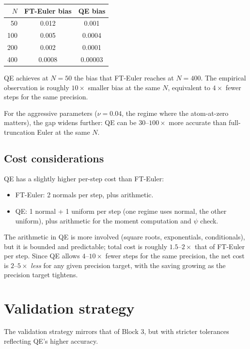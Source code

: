 \documentclass[11pt]{article}
\theoremstyle{plain}
\theoremstyle{definition}
\theoremstyle{remark}
\begin{document}
\begin{center}
\begin{tabular}{rcc}
\toprule
$N$ & FT-Euler bias & QE bias \\
\midrule
50 & 0.012 & 0.001 \\
100 & 0.005 & 0.0004 \\
200 & 0.002 & 0.0001 \\
400 & 0.0008 & 0.00003 \\
\bottomrule
\end{tabular}
\end{center}
QE achieves at $N = 50$ the bias that FT-Euler reaches at $N = 400$. The empirical observation is roughly $10\times$ smaller bias at the same $N$, equivalent to $4\times$ fewer steps for the same precision.

For the aggressive parameters ($\nu = 0.04$, the regime where the atom-at-zero matters), the gap widens further: QE can be $30$--$100\times$ more accurate than full-truncation Euler at the same $N$.

\subsection{Cost considerations}

QE has a slightly higher per-step cost than FT-Euler:
\begin{itemize}[topsep=2pt]
    \item FT-Euler: 2 normals per step, plus arithmetic.
    \item QE: 1 normal + 1 uniform per step (one regime uses normal, the other uniform), plus arithmetic for the moment computation and $\psi$ check.
\end{itemize}
The arithmetic in QE is more involved (square roots, exponentials, conditionals), but it is bounded and predictable; total cost is roughly $1.5$--$2\times$ that of FT-Euler per step. Since QE allows $4$--$10\times$ fewer steps for the same precision, the net cost is $2$--$5\times$ \emph{less} for any given precision target, with the saving growing as the precision target tightens.

\section{Validation strategy}

The validation strategy mirrors that of Block 3, but with stricter tolerances reflecting QE's higher accuracy.
\end{document}

